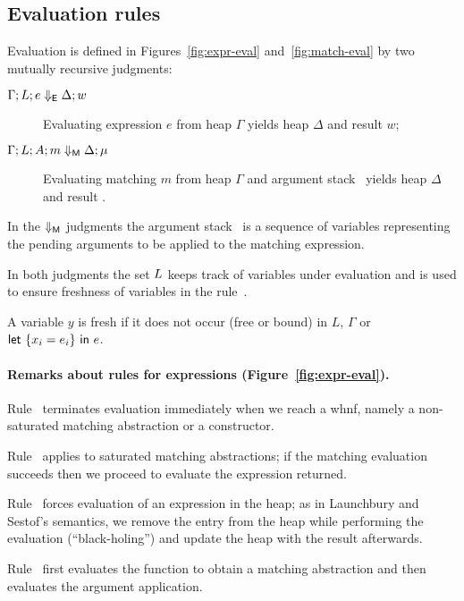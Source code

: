 \subsection{Evaluation rules}

Evaluation is defined in Figures~\ref{fig:expr-eval}
and~\ref{fig:match-eval} by two mutually recursive judgments:
\begin{description}
  \item[$\Gamma;L;e \Downarrow_{\textsf{E}} \Delta;w$]  Evaluating 
   expression $e$ from heap $\Gamma$ yields heap $\Delta$ and result $w$;
  \item[$\Gamma;L;A; m \Downarrow_{\textsf{M}} \Delta;\mu$] 
    Evaluating matching $m$ from heap $\Gamma$ and argument stack \argstack\
    yields heap $\Delta$ and result \matchresult.
  \end{description}

  In the $\Downarrow_{\textsf{M}}$ judgments the argument stack \argstack\ is
  a sequence of variables representing the pending arguments
  to be applied to the matching expression.

  In both judgments the set $L$ keeps track of variables under
  evaluation and is used to ensure freshness of variables in the
  \bigrule{Let} rule~\cite{sestof_1997}.
  \begin{definition}
    A variable $y$ is fresh if it does not occur (free or bound) in
    $L$, $\Gamma$ or $\textsf{let}~\{x_i=e_i\}~\textsf{in}~e$.
  \end{definition}
  

\paragraph{Remarks about rules for  expressions (Figure~\ref{fig:expr-eval}).}
  
  Rule~ terminates evaluation immediately when we reach a whnf,
  namely a non-saturated matching abstraction or a constructor.
  
  Rule~ applies to saturated matching abstractions;
  if the matching evaluation succeeds then
  we proceed to evaluate the expression returned.
    
  Rule~ forces evaluation of an expression in the heap; as in
  Launchbury and Sestof's semantics, we remove the entry
  from the heap  while performing the evaluation (``black-holing'')
  and update the heap with the result afterwards.
    
  Rule~ first evaluates the function to
  obtain a matching abstraction and then evaluates
  the argument application.
    
